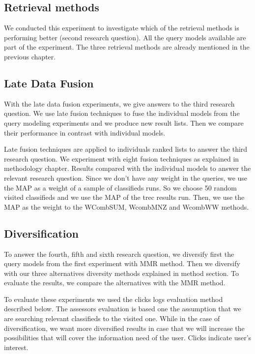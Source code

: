 \subsection{Retrieval methods}
We conducted this experiment to investigate which of the retrieval methods is performing better (second research question). All the query models available are part of the experiment. The three retrieval methods are already mentioned in the previous chapter.


\subsection{Late Data Fusion}

With the late data fusion experiments, we give answers to the third research question. We use late fusion techniques to fuse the individual models from the query modeling experiments and we produce new result lists. Then we compare their performance in contrast with individual models.


Late fusion techniques are applied to individuals ranked lists to answer the third research question. We experiment with eight fusion techniques as explained in methodology chapter. Results compared with the individual models to answer the relevant research question. Since we don't have any weight in the queries, we use the MAP as a weight of a sample of classifieds runs. So we choose 50 random visited classifieds and we use the MAP of the trec results run. Then, we use the MAP as the weight to the WCombSUM, WcombMNZ and WcombWW methods.

\subsection{Diversification}
To answer the fourth, fifth and sixth research question, we diversify first the query models from the first experiment with MMR method. Then we diversify with our three alternatives diversity methods explained in method section. To evaluate the results, we compare the alternatives with the MMR method.

To evaluate these experiments we used the clicks logs evaluation method described below. The assessors evaluation is based one the assumption that we are searching relevant classifieds to the visited one. While in the case of diversification, we want more diversified results in case that we will increase the possibilities that will cover the information need of the user. Clicks indicate user's interest.

